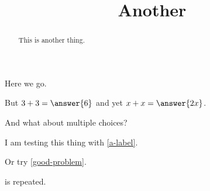 \documentclass{ximera}
\title{Another}
\begin{document}
\begin{abstract}
  This is another thing.
\end{abstract}
\maketitle

Here we go.

\begin{problem}
  But $3 + 3 = \answer{6}$ and yet $x + x = \answer{2x}$.
\end{problem}


And what about multiple choices?
\begin{problem}
\begin{multipleChoice}
\end{multipleChoice}
\end{problem}

I am testing this thing with \ref{a-label}.

Or try \ref{good-problem}.

\begin{theorem}
  \label{thm:another}
\end{theorem}

\begin{corollary}
  \label{thm:whee} is repeated.
\end{corollary}
\end{document}
